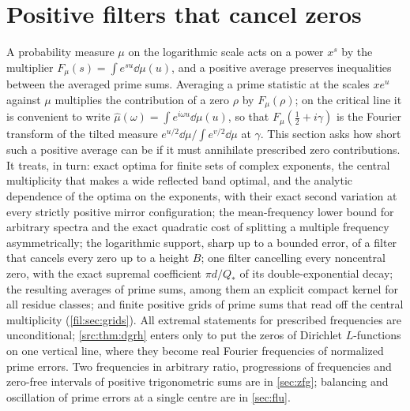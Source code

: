 \providecommand{\zerJ}{\mathcal{J}}
\providecommand{\zerK}{\mathcal{K}}
\providecommand{\zersinc}{\operatorname{sinc}}
\providecommand{\zergE}{\gamma_{\mathrm{E}}}
\providecommand{\zerLL}{\mathcal{L}}
\providecommand{\zerconv}{\operatorname{conv}}
\providecommand{\zerdiag}{\operatorname{diag}}
\providecommand{\zerSym}{\mathfrak{D}}
\providecommand{\zerLog}{\operatorname{Log}}
\providecommand{\anapos}[1]{\bigl(#1\bigr)_{+}}
\providecommand{\ananeg}[1]{\bigl(#1\bigr)_{-}}
\providecommand{\anaone}{\mathbf{1}}
\providecommand{\anaE}{\mathcal{E}}
\providecommand{\anaEx}{\mathbb{E}}
\providecommand{\anaPr}{\mathbb{P}}
\providecommand{\anaM}{\mathcal{M}}
\providecommand{\anaW}{\mathcal{W}}
\providecommand{\anaZ}{\mathcal{Z}}
\providecommand{\anaC}{\mathcal{C}}
\section{Positive filters that cancel zeros}\label{sec:fil}\label{rec:sec:dilation}
\providecommand{\filStir}[2]{\genfrac\{\}{0pt}{}{#1}{#2}}

A probability measure $\mu$ on the logarithmic scale acts on a power $x^s$ by the multiplier
$F_\mu(s)=\int e^{su}\dd\mu(u)$, and a positive average preserves inequalities between the averaged
prime sums. Averaging a prime statistic at the scales $xe^u$ against $\mu$ multiplies the contribution
of a zero $\rho$ by $F_\mu(\rho)$; on the critical line it is convenient to write
$\widehat\mu(\omega)=\int e^{i\omega u}\dd\mu(u)$, so that $F_\mu(\tfrac12+i\gamma)$ is the Fourier
transform of the tilted measure $e^{u/2}\dd\mu/\int e^{v/2}\dd\mu$ at $\gamma$. This section asks how
short such a positive average can be if it must annihilate prescribed zero contributions. It treats,
in turn: exact optima for finite sets of complex exponents, the central multiplicity that makes a
wide reflected band optimal, and the analytic dependence of the optima on the exponents, with their exact second variation at every strictly
positive mirror configuration; the
mean-frequency lower bound for arbitrary spectra and the exact quadratic cost of splitting a
multiple frequency asymmetrically; the logarithmic support, sharp up to a bounded error, of a filter
that cancels every zero up to a height $B$; one filter cancelling every noncentral zero, with the
exact supremal coefficient $\pi d/Q_*$ of its double-exponential decay; the resulting averages of
prime sums, among them an explicit compact kernel for all residue classes; and finite positive grids
of prime sums that read off the central multiplicity (\cref{fil:sec:grids}). All extremal statements
for prescribed frequencies are unconditional; \cref{src:thm:dgrh} enters only to put the zeros of
Dirichlet $L$-functions on one vertical line, where they become real Fourier frequencies of normalized
prime errors. Two frequencies in arbitrary ratio, progressions of frequencies and zero-free intervals
of positive trigonometric sums are in \cref{sec:zfg}; balancing and oscillation of prime errors at a
single centre are in \cref{sec:flu}.

